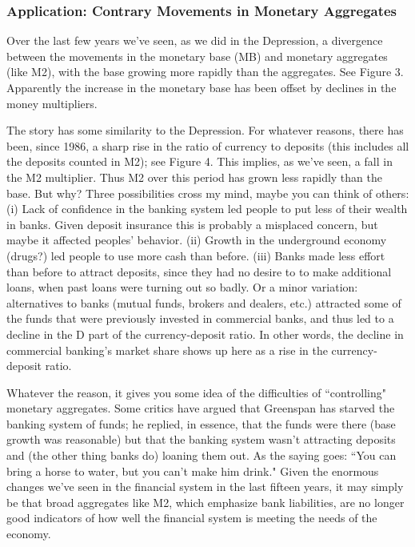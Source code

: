 \documentclass[letterpaper,12pt]{article}
\begin{document}
\subsubsection*{Application:  Contrary Movements in Monetary Aggregates}

     Over the last few years we've seen, as we did in the Depression, a
divergence between the movements in the monetary base (MB) and monetary aggregates (like M2), with
the base growing more rapidly than the aggregates. See Figure 3.  Apparently the increase in the
monetary base has been offset by declines in the money multipliers.

     The story has some similarity to the Depression.  For whatever reasons,
there has been, since 1986, a sharp rise in the ratio of currency to deposits (this includes all
the deposits counted in M2); see Figure 4.  This implies, as we've seen, a fall in the M2
multiplier.  Thus M2 over this period has grown less rapidly than the base.  But why?  Three
possibilities cross my mind, maybe you can think of others:  (i) Lack of confidence in the banking
system led people to put less of their wealth in banks.  Given deposit insurance this is probably
a misplaced concern, but maybe it affected peoples' behavior.  (ii) Growth in the underground
economy (drugs?) led people to use more cash than before.  (iii) Banks made less effort than
before to attract deposits, since they had no desire to to make additional loans, when past loans
were turning out so badly.  Or a minor variation: alternatives to banks (mutual funds, brokers and
dealers, etc.) attracted some of the funds that were previously invested in commercial banks, and
thus led to a decline in the D part of the currency-deposit ratio.  In other words, the decline in
commercial banking's market share shows up here as a rise in the currency-deposit ratio.

     Whatever the reason, it gives you some idea of the difficulties of
``controlling" monetary aggregates.  Some critics have argued that Greenspan has starved the
banking system of funds; he replied, in essence, that the funds were there (base growth was
reasonable) but that the banking system wasn't attracting deposits and (the other thing banks do)
loaning them out. As the saying goes:  ``You can bring a horse to water, but you can't make him
drink."  Given the enormous changes we've seen in the financial system in the last fifteen years,
it may simply be that broad aggregates like M2, which emphasize bank liabilities, are no longer
good indicators of how well the financial system is meeting the needs of the economy.
\end{document}
